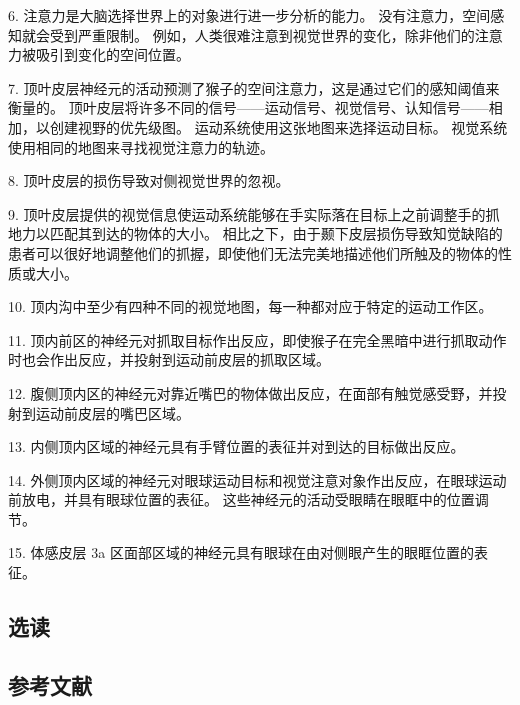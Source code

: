 6. 注意力是大脑选择世界上的对象进行进一步分析的能力。 没有注意力，空间感知就会受到严重限制。 例如，人类很难注意到视觉世界的变化，除非他们的注意力被吸引到变化的空间位置。 

7. 顶叶皮层神经元的活动预测了猴子的空间注意力，这是通过它们的感知阈值来衡量的。 顶叶皮层将许多不同的信号——运动信号、视觉信号、认知信号——相加，以创建视野的优先级图。 运动系统使用这张地图来选择运动目标。 视觉系统使用相同的地图来寻找视觉注意力的轨迹。 

8. 顶叶皮层的损伤导致对侧视觉世界的忽视。 

9. 顶叶皮层提供的视觉信息使运动系统能够在手实际落在目标上之前调整手的抓地力以匹配其到达的物体的大小。 相比之下，由于颞下皮层损伤导致知觉缺陷的患者可以很好地调整他们的抓握，即使他们无法完美地描述他们所触及的物体的性质或大小。 

10. 顶内沟中至少有四种不同的视觉地图，每一种都对应于特定的运动工作区。 

11. 顶内前区的神经元对抓取目标作出反应，即使猴子在完全黑暗中进行抓取动作时也会作出反应，并投射到运动前皮层的抓取区域。 

12. 腹侧顶内区的神经元对靠近嘴巴的物体做出反应，在面部有触觉感受野，并投射到运动前皮层的嘴巴区域。 

13. 内侧顶内区域的神经元具有手臂位置的表征并对到达的目标做出反应。 

14. 外侧顶内区域的神经元对眼球运动目标和视觉注意对象作出反应，在眼球运动前放电，并具有眼球位置的表征。 这些神经元的活动受眼睛在眼眶中的位置调节。 

15. 体感皮层 3a 区面部区域的神经元具有眼球在由对侧眼产生的眼眶位置的表征。

\subsection{选读}
\subsection{参考文献}